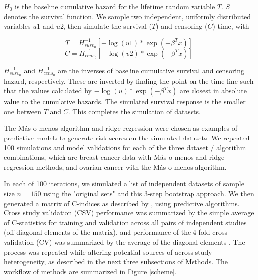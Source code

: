 \documentclass{bioinfo}
\begin{document}
    $H_{0}$ is the baseline cumulative hazard for the lifetime random variable $T$. $S$ denotes the survival function. We sample two independent, uniformly distributed
    variables $u1$ and $u2$, then simulate the survival ($T$) and censoring ($C$)
    time, with

    \begin{equation}\label{survivaltime}
      T = H_{surv_{0}}^{-1} [ - \log(u1) * \exp(-\beta^{T}x)]
    \end{equation}
    \begin{equation}\label{censoringtime}
      C = H_{cens_{0}}^{-1} [ - \log(u2) * \exp(-\beta^{T}x)]
    \end{equation}

    $H_{surv_{0}}^{-1}$ and $H_{cens_{0}}^{-1}$ are the inverses
    of baseline cumulative survival and censoring hazard, respectively.  These
    are inverted by finding
    the point on the time line such that the values calculated by
    $- \log(u) * \exp(- \beta^{T}x)$ are closest in absolute value to the
    cumulative hazards. The simulated survival response is the smaller one between
    $T$ and $C$. This completes the simulation of datasets.

	The M\'{a}s-o-menos algorithm \citep{Zhao2014} and ridge 
	regression \citep{hoerl1970ridge} were chosen as
    examples of predictive models to generate risk scores on the simulated datasets. 
    We repeated 100 simulations and model validations 
    for each of the three dataset / algorithm combinations, 
    which are breast cancer data with M\'{a}s-o-menos and ridge regression methods, 
    and ovarian cancer with the M\'{a}s-o-menos algorithm.
    
    In each of 100 iterations, we simulated a list of independent datasets of
    sample size $n=150$ using the "original sets" and this 3-step bootstrap approach.  We
    then generated a matrix of C-indices as described by
    \citet{Bernau2014}, using predictive algorithms. %
    Cross study validation (CSV) performance was summarized by the
    simple average of C-statistics for training and validation across
    all pairs of independent studies (off-diagonal elements of the
    matrix), and performance of the 4-fold cross validation (CV) was summarized by the average
    of the diagonal elements \citep{Bernau2014}. The process was
    repeated while altering potential sources of across-study
    heterogeneity, as described in the next three subsections of
    Methods. The workflow of methods are summarized in Figure \ref{scheme}.
\end{document}
